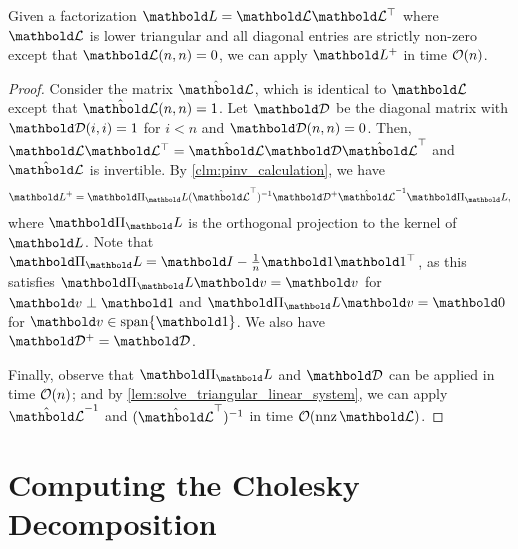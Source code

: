 \begin{lem}
Given a factorization $\mL = \mCalL\trans{\mCalL}$ where $\mCalL$ is lower triangular and all diagonal entries are strictly non-zero except that $\mCalL(n,n) = 0$, we can apply $\pinv{\mL}$ in time $\LandauO{n}$.
\end{lem}
\begin{proof} Consider the matrix $\hat{\mCalL}$, which is identical to $\mCalL$ except that $\hat{\mCalL}(n,n) = 1$. Let $\mCalD$ be the diagonal matrix with $\mCalD(i,i) = 1$ for $i < n$ and $\mCalD(n,n) = 0$. Then, $\mCalL\trans{\mCalL} = \hat{\mCalL}\mCalD\trans{\hat{\mCalL}}$ and $\hat{\mCalL}$ is invertible. By \cref{clm:pinv_calculation}, we have \begin{align*}
    \pinv{\mL} = \mPi_\mL \inv{(\trans{\hat{\mCalL}})} \pinv{\mCalD} \inv{\hat{\mCalL}} \mPi_\mL,
\end{align*} where $\mPi_\mL$ is the orthogonal projection to the kernel of $\mL$. Note that $\mPi_\mL = \mI - \frac{1}{n}\vOne\trans{\vOne}$, as this satisfies $\mPi_\mL\vv = \vv$ for $\vv \perp \vOne$ and $\mPi_\mL\vv = \vZero$ for $\vv \in \vspan\{\vOne\}$. We also have $\pinv{\mCalD} = \mCalD$.

Finally, observe that $\mPi_\mL$ and $\mCalD$ can be applied in time $\LandauO{n}$; and by \cref{lem:solve_triangular_linear_system}, we can apply $\inv{\hat{\mCalL}}$ and $\inv{(\trans{\hat{\mCalL}})}$ in time $\LandauO{\nnz{\mCalL}}$.
\end{proof}

\section{Computing the Cholesky Decomposition}

